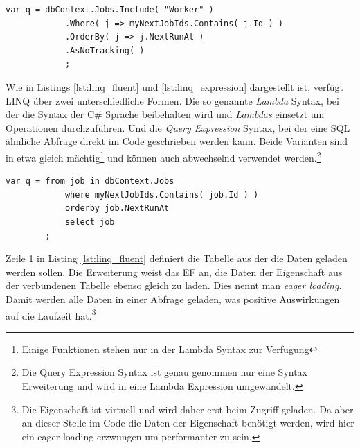 \begin{lstlisting}[caption={LINQ Abfrage - Lambda Syntax, siehe DefaultJobLoader.cs - DoLoad()},label={lst:linq_fluent},captionpos=b]
	var q = dbContext.Jobs.Include( "Worker" )
			.Where( j => myNextJobIds.Contains( j.Id ) )
			.OrderBy( j => j.NextRunAt )
			.AsNoTracking( )
			;

\end{lstlisting}
Wie in Listings \ref{lst:linq_fluent} und \ref{lst:linq_expression} dargestellt ist, verfügt LINQ über zwei unterschiedliche Formen. Die so genannte \emph{Lambda} Syntax, bei der die Syntax der C\# Sprache beibehalten wird und \emph{Lambdas} einsetzt um Operationen durchzuführen. Und die \emph{Query Expression} Syntax, bei der eine SQL ähnliche Abfrage direkt im Code geschrieben werden kann. Beide Varianten sind in etwa gleich mächtig\footnote{Einige Funktionen stehen nur in der Lambda Syntax zur Verfügung} und können auch abwechselnd verwendet werden.\footnote{Die Query Expression Syntax ist genau genommen nur eine Syntax Erweiterung und wird in eine Lambda Expression umgewandelt.\parencite{linq}}
\begin{lstlisting}[caption={LINQ Abfrage - Query Expression Syntax},label={lst:linq_expression},captionpos=b]
	var q = from job in dbContext.Jobs
			where myNextJobIds.Contains( job.Id ) )
			orderby job.NextRunAt
			select job
		;
\end{lstlisting}
Zeile 1 in Listing \ref{lst:linq_fluent} definiert die Tabelle aus der die Daten geladen werden sollen. Die Erweiterung  weist das EF an, die Daten der Eigenschaft  aus der verbundenen Tabelle ebenso gleich zu laden. Dies nennt man \emph{eager loading}. Damit werden alle Daten in einer Abfrage geladen, was positive Auswirkungen auf die Laufzeit hat.\footnote{Die Eigenschaft  ist virtuell und wird daher erst beim Zugriff geladen. Da aber an dieser Stelle im Code die Daten der  Eigenschaft benötigt werden, wird hier ein eager-loading erzwungen um performanter zu sein.}
